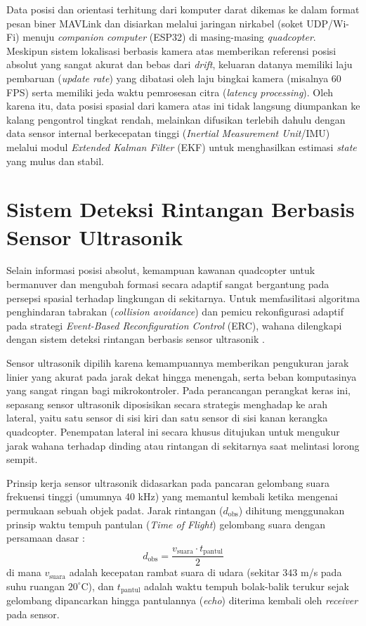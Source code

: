 \documentclass[12pt,a4paper]{report}
\numberwithin{equation}{chapter}
\begin{document}
Data posisi dan orientasi terhitung dari komputer darat dikemas ke dalam format pesan biner MAVLink dan disiarkan melalui jaringan nirkabel (soket UDP/Wi-Fi) menuju \textit{companion computer} (ESP32) di masing-masing \textit{quadcopter}.
Meskipun sistem lokalisasi berbasis kamera atas memberikan referensi posisi absolut yang sangat akurat dan bebas dari \textit{drift}, keluaran datanya memiliki laju pembaruan (\textit{update rate}) yang dibatasi oleh laju bingkai kamera (misalnya 60 FPS) serta memiliki jeda waktu pemrosesan citra (\textit{latency processing}).
Oleh karena itu, data posisi spasial dari kamera atas ini tidak langsung diumpankan ke kalang pengontrol tingkat rendah, melainkan difusikan terlebih dahulu dengan data sensor internal berkecepatan tinggi (\textit{Inertial Measurement Unit}/IMU) melalui modul \textit{Extended Kalman Filter} (EKF) untuk menghasilkan estimasi \textit{state} yang mulus dan stabil.

\section{Sistem Deteksi Rintangan Berbasis Sensor Ultrasonik}

Selain informasi posisi absolut, kemampuan kawanan quadcopter untuk bermanuver dan mengubah formasi secara adaptif sangat bergantung pada persepsi spasial terhadap lingkungan di sekitarnya. Untuk memfasilitasi algoritma penghindaran tabrakan (\textit{collision avoidance}) dan pemicu rekonfigurasi adaptif pada strategi \textit{Event-Based Reconfiguration Control} (ERC), wahana dilengkapi dengan sistem deteksi rintangan berbasis sensor ultrasonik \cite{siegwartIntroductionAutonomousMobile2004}.

Sensor ultrasonik dipilih karena kemampuannya memberikan pengukuran jarak linier yang akurat pada jarak dekat hingga menengah, serta beban komputasinya yang sangat ringan bagi mikrokontroler. Pada perancangan perangkat keras ini, sepasang sensor ultrasonik diposisikan secara strategis menghadap ke arah lateral, yaitu satu sensor di sisi kiri dan satu sensor di sisi kanan kerangka quadcopter. Penempatan lateral ini secara khusus ditujukan untuk mengukur jarak wahana terhadap dinding atau rintangan di sekitarnya saat melintasi lorong sempit.

Prinsip kerja sensor ultrasonik didasarkan pada pancaran gelombang suara frekuensi tinggi (umumnya 40 kHz) yang memantul kembali ketika mengenai permukaan sebuah objek padat. Jarak rintangan ($d_{\text{obs}}$) dihitung menggunakan prinsip waktu tempuh pantulan (\textit{Time of Flight}) gelombang suara dengan persamaan dasar \cite{borensteinObstacleAvoidanceUltrasonic1988}:
\begin{equation}
    d_{\text{obs}} = \frac{v_{\text{suara}} \cdot t_{\text{pantul}}}{2}
\end{equation}
di mana $v_{\text{suara}}$ adalah kecepatan rambat suara di udara (sekitar $343$ m/s pada suhu ruangan $20^\circ\text{C}$), dan $t_{\text{pantul}}$ adalah waktu tempuh bolak-balik terukur sejak gelombang dipancarkan hingga pantulannya (\textit{echo}) diterima kembali oleh \textit{receiver} pada sensor.
\end{document}
